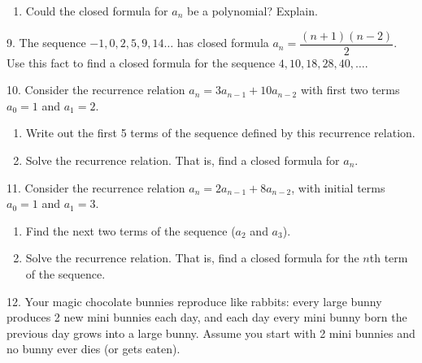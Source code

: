 \documentclass[10pt,]{book}
\theoremstyle{plain}
\theoremstyle{definition}
\theoremstyle{definition}
\theoremstyle{definition}
\numberwithin{equation}{chapter}
\begin{document}
\begin{exerciselist}
\begin{enumerate}[label=(\alph*)]
\item\hypertarget{li-986}{}
                Could the closed formula for \(a_n\) be a polynomial? Explain.
\end{enumerate}
\par\smallskip
\item[9.]\hypertarget{exercise-196}{}
            The sequence \(-1, 0, 2, 5, 9, 14\ldots\) has closed formula \(a_n = \dfrac{(n+1)(n-2)}{2}\). Use this fact to find a closed formula for the sequence \(4, 10, 18, 28, 40, \ldots\).
\par\smallskip
\item[10.]\hypertarget{exercise-197}{}
            Consider the recurrence relation \(a_n = 3a_{n-1} + 10 a_{n-2}\) with first two terms \(a_0 = 1\) and \(a_1 = 2\).
\leavevmode%
\begin{enumerate}[label=(\alph*)]
\item\hypertarget{li-989}{}
                Write out the first 5 terms of the sequence defined by this recurrence relation.
\item\hypertarget{li-990}{}
                Solve the recurrence relation. That is, find a closed formula for \(a_n\).
\end{enumerate}
\par\smallskip
\item[11.]\hypertarget{exercise-198}{}
            Consider the recurrence relation \(a_n = 2a_{n-1} + 8a_{n-2}\), with initial terms \(a_0 = 1\) and \(a_1= 3\).
\leavevmode%
\begin{enumerate}[label=(\alph*)]
\item\hypertarget{li-993}{}
                Find the next two terms of the sequence (\(a_2\) and \(a_3\)).
\item\hypertarget{li-994}{}
                Solve the recurrence relation. That is, find a closed formula for the \(n\)th term of the sequence.
\end{enumerate}
\par\smallskip
\item[12.]\hypertarget{exercise-199}{}
            Your magic chocolate bunnies reproduce like rabbits: every large bunny produces 2 new mini bunnies each day, and each day every mini bunny born the previous day grows into a large bunny. Assume you start with 2 mini bunnies and no bunny ever dies (or gets eaten).
\leavevmode%
\begin{enumerate}[label=(\alph*)]

\end{enumerate}
\end{exerciselist}
\end{document}
